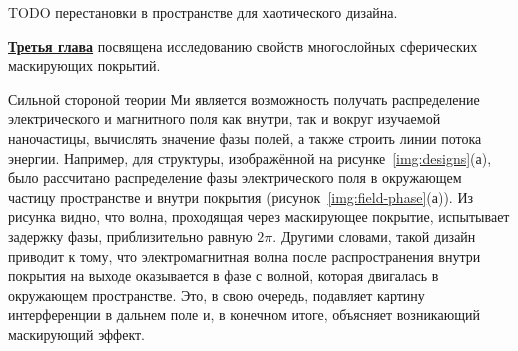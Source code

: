 TODO перестановки в пространстве для хаотического дизайна.

\underline{\textbf{Третья глава}} посвящена исследованию свойств
многослойных сферических маскирующих покрытий.


Сильной стороной теории Ми является возможность получать распределение
электрического и магнитного поля как внутри, так и вокруг изучаемой
наночастицы, вычислять значение фазы полей, а также строить линии
потока энергии.  Например, для структуры, изображённой на
рисунке~\ref{img:designs}(а), было рассчитано распределение фазы
электрического поля в окружающем частицу пространстве и внутри
покрытия (рисунок~\ref{img:field-phase}(а)).  Из рисунка видно, что
волна, проходящая через маскирующее покрытие, испытывает задержку фазы,
приблизительно равную $2\pi$. Другими словами, такой дизайн приводит к
тому, что электромагнитная волна после распространения внутри покрытия
на выходе оказывается в фазе с волной, которая двигалась в окружающем
пространстве.  Это, в свою очередь, подавляет картину интерференции в
дальнем поле и, в конечном итоге, объясняет возникающий маскирующий
эффект.

\clearpage